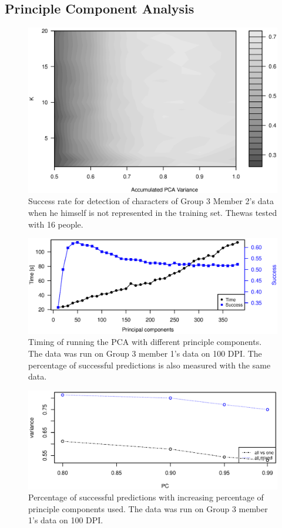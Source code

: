 \subsection{Principle Component Analysis}


\begin{figure}[H]
\centering
\includegraphics[width = 16cm]{graphics/contour_k_PCA_oneVsRest}
\caption{Success rate for detection of characters of Group 3 Member 2's data when he himself is not represented in the training set. 
Thewas tested with 16 people.}
\label{fig:}
\end{figure}


\begin{figure}
\centering
\includegraphics[width =0.8 \textwidth]{graphics/pca_timing}
\caption{Timing of running the PCA with different principle components. 
The data was run on Group 3 member 1's data on 100 DPI. 
The percentage of successful predictions is also measured with the same data.}
\label{fig:pca_timing}
\end{figure}

\begin{figure}
\centering
\includegraphics[width =0.8 \textwidth]{graphics/pca_success}
\caption{Percentage of successful predictions with increasing percentage of principle components used.
The data was run on Group 3 member 1's data on 100 DPI. }
\label{fig:pca_success}
\end{figure}

